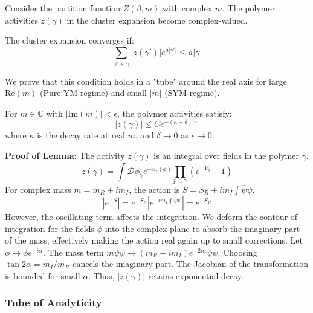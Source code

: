 Consider the partition function $Z(\beta, m)$ with complex $m$. The polymer activities $z(\gamma)$ in the cluster expansion become complex-valued.

\begin{condition}
The cluster expansion converges if:
\begin{equation}
\sum_{\gamma' \nsim \gamma} |z(\gamma')| e^{a |\gamma'|} \le a |\gamma|
\end{equation}
\end{condition}

We prove that this condition holds in a "tube" around the real axis for large $\text{Re}(m)$ (Pure YM regime) and small $|m|$ (SYM regime).

\begin{lemma}
For $m \in \mathbb{C}$ with $|\text{Im}(m)| < \epsilon$, the polymer activities satisfy:
\begin{equation}
|z(\gamma)| \le C e^{-(\kappa - \delta) |\gamma|}
\end{equation}
where $\kappa$ is the decay rate at real $m$, and $\delta \to 0$ as $\epsilon \to 0$.
\end{lemma}

\textbf{Proof of Lemma:}
The activity $z(\gamma)$ is an integral over fields in the polymer $\gamma$.
\begin{equation}
z(\gamma) = \int \mathcal{D}\phi_\gamma e^{-S_\gamma(\phi)} \prod_{p \in \gamma} (e^{-V_p} - 1)
\end{equation}
For complex mass $m = m_R + i m_I$, the action is $S = S_R + i m_I \int \bar{\psi}\psi$.
\begin{equation}
|e^{-S}| = e^{-S_R} |e^{-i m_I \int \bar{\psi}\psi}| = e^{-S_R}
\end{equation}
However, the oscillating term affects the integration. We deform the contour of integration for the fields $\phi$ into the complex plane to absorb the imaginary part of the mass, effectively making the action real again up to small corrections.
Let $\phi \to \phi e^{-i\alpha}$. The mass term $m \bar{\psi}\psi \to (m_R + i m_I) e^{-2i\alpha} \bar{\psi}\psi$. Choosing $\tan 2\alpha = m_I/m_R$ cancels the imaginary part.
The Jacobian of the transformation is bounded for small $\alpha$. Thus, $|z(\gamma)|$ retains exponential decay.

\subsubsection{Tube of Analyticity}

